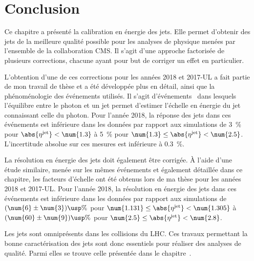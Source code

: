 \section{Conclusion}\label{chapter-JERC-section-conclusion}
Ce chapitre a présenté la calibration en énergie des jets.
Elle permet d'obtenir des jets de la meilleure qualité possible pour les analyses de physique menées par l'ensemble de la collaboration CMS.
Il s'agit d'une approche factorisée de plusieurs corrections, chacune ayant pour but de corriger un effet en particulier.
\par L'obtention d'une de ces corrections pour les années 2018 et 2017-UL a fait partie de mon travail de thèse et a été développée plus en détail, ainsi que la phénoménologie des événements utilisés.
Il s'agit d'événements \Gjets\ dans lesquels l'équilibre entre le photon et un jet permet d'estimer l'échelle en énergie du jet connaissant celle du photon.
Pour l'année 2018, la réponse des jets dans ces événements est inférieure dans les données par rapport aux simulations
de
\SI{3}{\%} pour $\abs{\eta^\text{jet}} < \num{1.3}$
à
\SI{5}{\%} pour $\num{1.3} \leq \abs{\eta^\text{jet}} < \num{2.5}$.
L'incertitude absolue sur ces mesures est inférieure à \SI{0.3}{\%}.
\par La résolution en énergie des jets doit également être corrigée.
À l'aide d'une étude similaire, menée sur les mêmes événements et également détaillée dans ce chapitre, les facteurs d'échelle ont été obtenus lors de ma thèse pour les années 2018 et 2017-UL.
Pour l'année 2018, la résolution en énergie des jets dans ces événements est inférieure dans les données par rapport aux simulations
de
$(\num{6}\pm\num{3})\usp\%$ pour $\num{1.131} \leq \abs{\eta^\text{jet}} < \num{1.305}$
à
$(\num{60}\pm\num{9})\usp\%$ pour $\num{2.5} \leq \abs{\eta^\text{jet}} < \num{2.8}$.
\par Les jets sont omniprésents dans les collisions du LHC.
Ces travaux permettant la bonne caractérisation des jets sont donc essentiels pour réaliser des analyses de qualité.
Parmi elles se trouve celle présentée dans le chapitre~.